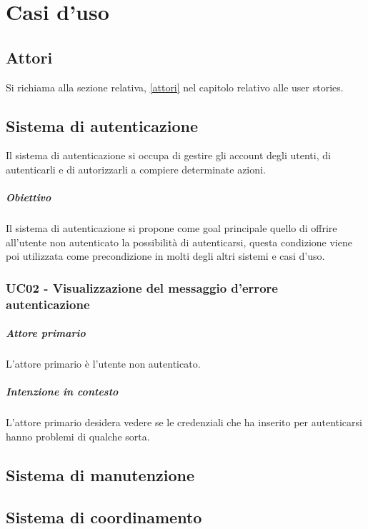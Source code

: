 \chapter{Casi d'uso}\label{casi-d-uso}
\section{Attori}

Si richiama alla sezione relativa, \ref{attori} nel capitolo relativo alle user stories.

\section{Sistema di autenticazione}

Il sistema di autenticazione si occupa di gestire gli account degli utenti, di autenticarli e di autorizzarli a compiere determinate azioni.

\paragraph{Obiettivo} Il sistema di autenticazione si propone come goal principale quello di offrire all'utente non autenticato la possibilità di autenticarsi, questa condizione viene poi utilizzata come precondizione in molti degli altri sistemi e casi d'uso.



\subsection{UC02 - Visualizzazione del messaggio d'errore autenticazione}

\paragraph{Attore primario} L'attore primario è l'utente non autenticato.

\paragraph{Intenzione in contesto} L'attore primario desidera vedere se le credenziali che ha inserito per autenticarsi hanno problemi di qualche sorta.

\section{Sistema di manutenzione}

\section{Sistema di coordinamento}










